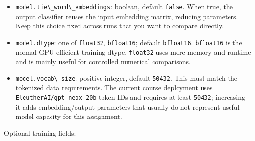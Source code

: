 \documentclass[
]{article}
\newcommand{\passthrough}[1]{#1}
\begin{document}
\begin{itemize}
  base. Leave the default unless you are deliberately studying
  position-encoding behavior.
\item
  \passthrough{\lstinline!model.tie\_word\_embeddings!}: boolean,
  default \passthrough{\lstinline!false!}. When true, the output
  classifier reuses the input embedding matrix, reducing parameters.
  Keep this choice fixed across runs that you want to compare directly.
\item
  \passthrough{\lstinline!model.dtype!}: one of
  \passthrough{\lstinline!float32!}, \passthrough{\lstinline!bfloat16!};
  default \passthrough{\lstinline!bfloat16!}.
  \passthrough{\lstinline!bfloat16!} is the normal GPU-efficient
  training dtype. \passthrough{\lstinline!float32!} uses more memory and
  runtime and is mainly useful for controlled numerical comparisons.
\item
  \passthrough{\lstinline!model.vocab\_size!}: positive integer, default
  \passthrough{\lstinline!50432!}. This must match the tokenized data
  requirements. The current course deployment uses
  \passthrough{\lstinline!EleutherAI/gpt-neox-20b!} token IDs and
  requires at least \passthrough{\lstinline!50432!}; increasing it adds
  embedding/output parameters that usually do not represent useful model
  capacity for this assignment.
\end{itemize}

Optional training fields:
\end{document}
